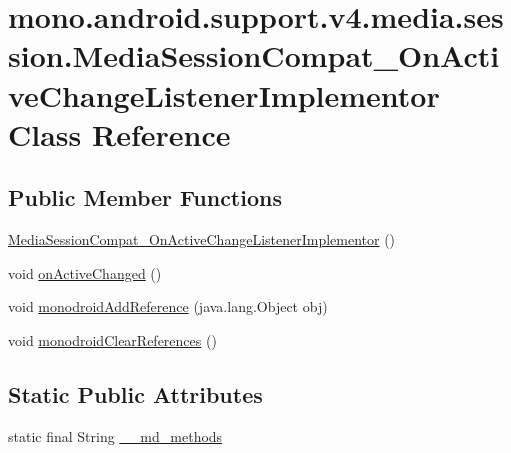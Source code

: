 \hypertarget{classmono_1_1android_1_1support_1_1v4_1_1media_1_1session_1_1_media_session_compat___on_active_change_listener_implementor}{
\section{mono.android.support.v4.media.session.MediaSessionCompat\_\-OnActiveChangeListenerImplementor Class Reference}
\label{classmono_1_1android_1_1support_1_1v4_1_1media_1_1session_1_1_media_session_compat___on_active_change_listener_implementor}
}
\subsection*{Public Member Functions}
\begin{CompactItemize}
\item 
\hyperlink{classmono_1_1android_1_1support_1_1v4_1_1media_1_1session_1_1_media_session_compat___on_active_change_listener_implementor_031167fa185db51da4bfcbbce12d46f8}{MediaSessionCompat\_\-OnActiveChangeListenerImplementor} ()
\item 
void \hyperlink{classmono_1_1android_1_1support_1_1v4_1_1media_1_1session_1_1_media_session_compat___on_active_change_listener_implementor_0672dc8fe59e6c7a18b1755ca87be36d}{onActiveChanged} ()
\item 
void \hyperlink{classmono_1_1android_1_1support_1_1v4_1_1media_1_1session_1_1_media_session_compat___on_active_change_listener_implementor_01e79fbddef692a8bb55ae13792dc8c4}{monodroidAddReference} (java.lang.Object obj)
\item 
void \hyperlink{classmono_1_1android_1_1support_1_1v4_1_1media_1_1session_1_1_media_session_compat___on_active_change_listener_implementor_9734f63b8b6ae5e64326da1f4b548bda}{monodroidClearReferences} ()
\end{CompactItemize}
\subsection*{Static Public Attributes}
\begin{CompactItemize}
\item 
static final String \hyperlink{classmono_1_1android_1_1support_1_1v4_1_1media_1_1session_1_1_media_session_compat___on_active_change_listener_implementor_7d352c858f06680808244b09f3ed2849}{\_\-\_\-md\_\-methods}
\end{CompactItemize}
